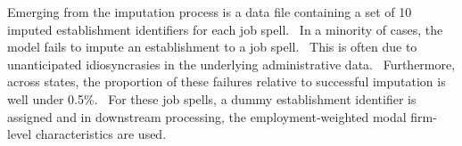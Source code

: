  Emerging from the imputation process is a data file containing a
set of 10 imputed establishment identifiers for each job spell. \ In a
minority of cases, the model fails to impute an establishment to a job
spell. \ This is often due to unanticipated idiosyncrasies in the underlying
administrative data. \ Furthermore, across states, the proportion of these
failures relative to successful imputation is well under 0.5\%. \ For these
job spells, a dummy establishment identifier is assigned and in downstream
processing, the employment-weighted modal firm-level characteristics are
used.



